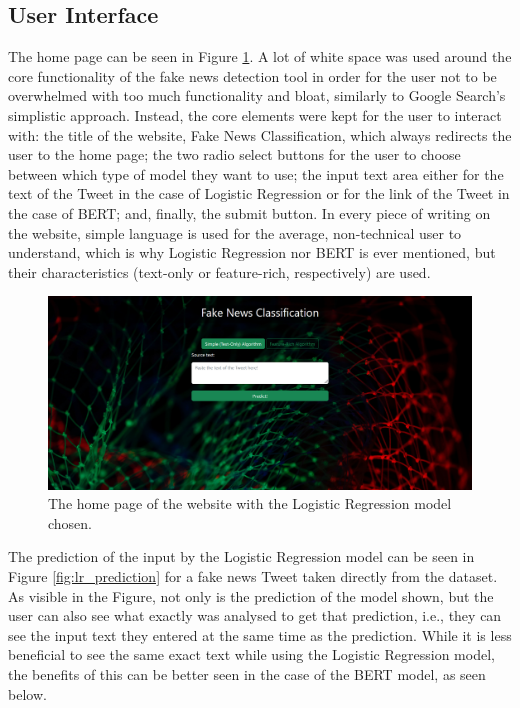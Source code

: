 \documentclass{l4proj}
\begin{document}
\subsection{User Interface}

The home page can be seen in Figure \ref{fig:home_page}. A lot of white space was used around the core functionality of the fake news detection tool in order for the user not to be overwhelmed with too much functionality and bloat, similarly to Google Search's simplistic approach. Instead, the core elements were kept for the user to interact with: the title of the website, Fake News Classification, which always redirects the user to the home page; the two radio select buttons for the user to choose between which type of model they want to use; the input text area either for the text of the Tweet in the case of Logistic Regression or for the link of the Tweet in the case of BERT; and, finally, the submit button. In every piece of writing on the website, simple language is used for the average, non-technical user to understand, which is why Logistic Regression nor BERT is ever mentioned, but their characteristics (text-only or feature-rich, respectively) are used.

\begin{figure}
    \centering
    \includegraphics[width=1\linewidth]{images/web/home.png}    

    \caption{The home page of the website with the Logistic Regression model chosen.}
    \label{fig:home_page} 
\end{figure}

The prediction of the input by the Logistic Regression model can be seen in Figure \ref{fig:lr_prediction} for a fake news Tweet taken directly from the dataset. As visible in the Figure, not only is the prediction of the model shown, but the user can also see what exactly was analysed to get that prediction, i.e., they can see the input text they entered at the same time as the prediction. While it is less beneficial to see the same exact text while using the Logistic Regression model, the benefits of this can be better seen in the case of the BERT model, as seen below.
\end{document}
